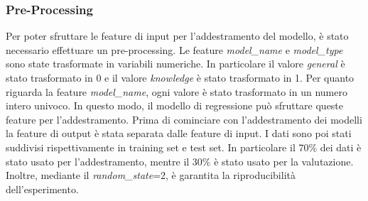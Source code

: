 \subsubsection{Pre-Processing}

Per poter sfruttare le feature di input per l'addestramento del modello, è stato necessario effettuare un pre-processing. Le feature \textit{model\_name} e \textit{model\_type} sono state trasformate in variabili numeriche. In particolare il valore \textit{general} è stato trasformato in 0 e il valore \textit{knowledge} è stato trasformato in 1.
Per quanto riguarda la feature \textit{model\_name}, ogni valore è stato trasformato in un numero intero univoco. In questo modo, il modello di regressione può sfruttare queste feature per l'addestramento.
Prima di cominciare con l'addestramento dei modelli la feature di output è stata separata dalle feature di input. I dati sono poi stati suddivisi rispettivamente in training set e test set. In particolare il 70\% dei dati è stato usato per l'addestramento, mentre il 30\% è stato usato per la valutazione. Inoltre, mediante il \textit{random\_state}=2, è garantita la riproducibilità dell'esperimento.

